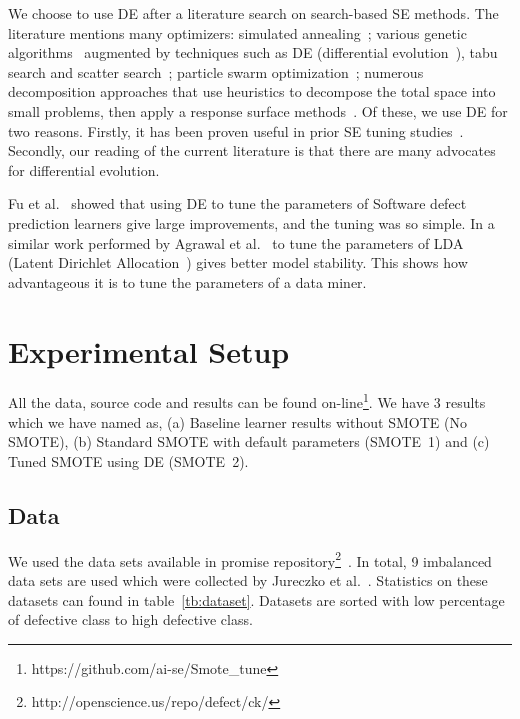 \documentclass[sigconf,review, anonymous]{acmart}
\theoremstyle{break}
\begin{document}
We choose to use DE after a literature search on search-based SE methods.
The literature mentions many optimizers: simulated
annealing~\cite{feather2002converging, menzies2007business}; various genetic
algorithms~\cite{goldberg1979complexity} augmented by techniques such as
DE (differential evolution~\cite{storn1997differential}), tabu search and scatter
search~\cite{glover1986general, beausoleil2006moss, molina2007sspmo,nebro2008abyss}; particle swarm optimization~\cite{pan2008particle}; numerous
decomposition approaches that use heuristics to decompose the total space into
small problems, then apply a response surface methods~\cite{krall2015gale, zuluaga2013active}.
Of these, we use DE for two reasons. Firstly, it has been proven useful in prior SE tuning
studies~\cite{fu2016tuning, agrawal2016wrong}. Secondly, our reading of the current literature is
that there are many advocates for differential evolution.

Fu et al.~\cite{fu2016tuning} showed that using DE to tune the parameters of Software defect prediction learners give large improvements, and the tuning was so simple. In a similar work performed by Agrawal et al.~\cite{agrawal2016wrong} to tune the parameters of LDA (Latent Dirichlet Allocation~\cite{blei2003latent}) gives better model stability. This shows how advantageous it is to tune the parameters of a data miner.

\section{Experimental Setup}
\label{sect:experiment}

All the data, source code and results can be found on-line\footnote{https://github.com/ai-se/Smote\_tune}. We have 3 results which we have named as, (a) Baseline learner results without SMOTE (No SMOTE), (b) Standard SMOTE with default parameters (SMOTE~1) and (c) Tuned SMOTE using DE (SMOTE~2).

\subsection{\textbf{Data}}
 We used the data sets available in promise repository\footnote{http://openscience.us/repo/defect/ck/}~\cite{promiserepo}. In total, 9 imbalanced data sets are used which were collected by Jureczko et al.~\cite{jureczko2010towards}. Statistics on these datasets can found in table~\ref{tb:dataset}. Datasets are sorted with low percentage of defective class to high defective class.
 
\end{document}
